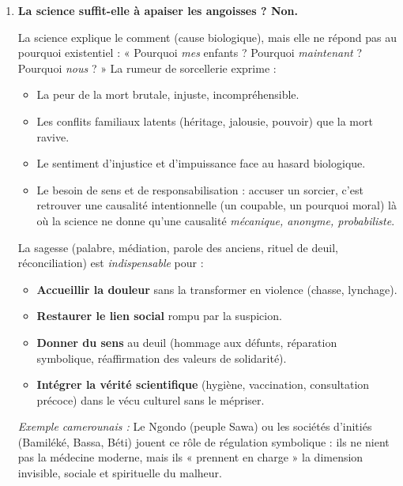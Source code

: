 \documentclass[11pt]{article}
\newcommand{\cle}[1]{{\popxbold\color{popdark}#1}}
\begin{document}
\begin{corrige}
\begin{enumerate}
\item \textbf{La science suffit-elle à apaiser les angoisses ? Non.}
\par La science explique le \cle{comment} (cause biologique), mais elle ne répond pas au \cle{pourquoi existentiel} : « Pourquoi \emph{mes} enfants ? Pourquoi \emph{maintenant} ? Pourquoi \emph{nous} ? » La rumeur de sorcellerie exprime :
\begin{itemize}
\item La \cle{peur de la mort} brutale, injuste, incompréhensible.
\item Les \cle{conflits familiaux} latents (héritage, jalousie, pouvoir) que la mort ravive.
\item Le \cle{sentiment d'injustice} et d'impuissance face au hasard biologique.
\item Le \cle{besoin de sens} et de \cle{responsabilisation} : accuser un sorcier, c'est retrouver une \cle{causalité intentionnelle} (un coupable, un pourquoi moral) là où la science ne donne qu'une causalité \emph{mécanique, anonyme, probabiliste}.
\end{itemize}
\par La \cle{sagesse} (palabre, médiation, parole des anciens, rituel de deuil, réconciliation) est \emph{indispensable} pour :
\begin{itemize}
\item \textbf{Accueillir la douleur} sans la transformer en violence (chasse, lynchage).
\item \textbf{Restaurer le lien social} rompu par la suspicion.
\item \textbf{Donner du sens} au deuil (hommage aux défunts, réparation symbolique, réaffirmation des valeurs de solidarité).
\item \textbf{Intégrer la vérité scientifique} (hygiène, vaccination, consultation précoce) dans le \cle{vécu culturel} sans le mépriser.
\end{itemize}
\par\emph{Exemple camerounais :} Le \cle{Ngondo} (peuple Sawa) ou les \cle{sociétés d'initiés} (Bamiléké, Bassa, Béti) jouent ce rôle de \cle{régulation symbolique} : ils ne nient pas la médecine moderne, mais ils « prennent en charge » la dimension invisible, sociale et spirituelle du malheur.


\end{enumerate}
\end{corrige}
\end{document}
